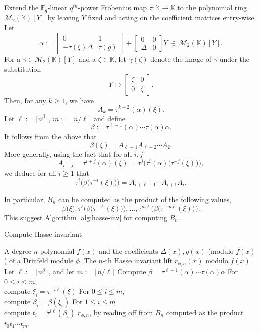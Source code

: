 \documentclass{article}
\theoremstyle{plain}
\theoremstyle{definition}
\def\F{\ensuremath{\mathbb{F}}}
\def\K{\ensuremath{\mathbb{K}}}
\begin{document}
Extend the $\F_q$-linear $q^{th}$-power Frobenius map $\tau: \K \to \K$ to the polynomial ring $\mathscr{M}_2(\K)[Y]$ by leaving $Y$ fixed and acting on the 
coefficient matrices entry-wise.
Let
\[
\alpha := 
\begin{bmatrix}
0 & 1 \\
-\tau(\xi)\Delta & \tau(g)
\end{bmatrix}
+
\begin{bmatrix}
0 & 0 \\
\Delta & 0
\end{bmatrix} Y ~ \in ~ \mathscr{M}_2(\K)[Y].
\]
For a $\gamma \in \mathscr{M}_2(\K)[Y]$ and a $\zeta \in \K$, let $\gamma(\zeta)$ denote the image of $\gamma$ under the substitution \[Y \longmapsto \begin{bmatrix}
\zeta & 0 \\
0 & \zeta
\end{bmatrix}.\]
Then, for any $k \ge 1$, we have $$A_k = \tau^{k - 2}(\alpha)(\xi).$$
Let $\ell := \lceil n^\beta \rceil$, $m := \lceil n / \ell \rceil$ and define 
\[\beta := \tau^{\ell-1}(\alpha) \cdots \tau(\alpha) \alpha.\]
It follows from the above that 
\[\beta(\xi) = A_{\ell-1}A_{\ell - 2} \cdots A_2.\]
More generally, using the fact that for all $i, j$
\[A_{i + j} = \tau^{i + j}(\alpha)(\xi) = \tau^j\Big(\tau^i(\alpha)\big( \tau^{-j}(\xi)\big)\Big),\]
we deduce for all $i \ge 1$ that 
\[\tau^{i}\Big(\beta \big( \tau^{-i}(\xi)\big) \Big) = A_{i + \ell-1} \cdots A_{i + 1}A_i.\]

In particular, $B_n$ can be computed as the product of the following values, 
\[
\beta \big(\xi\big), \tau^{\ell}\Big(\beta \big( \tau^{-\ell}(\xi)\big) \Big), \dots, 
\tau^{m \ell}\Big(\beta \big( \tau^{-m \ell}(\xi)\big) \Big).
\]
This suggest Algorithm \ref{alg:hasse-inv} for computing $B_n$.

\begin{algorithm}[H]
	\caption{Compute Hasse invariant}
	\label{alg:hasse-inv}
	\begin{algorithmic}[1]
		\REQUIRE A degree $n$ polynomial $f(x)$ and the coefficients $\Delta(x), g(x)$ (modulo $f(x)$) of a Drinfeld module $\phi$.
		\ENSURE The $n$-th Hasse invariant lift $r_{\phi,n}(x)$ modulo $f(x)$.
		\STATE Let $\ell := \lceil n^\beta \rceil$, and let $m := \lceil n / \ell \rceil$
		\STATE\label{step:hasse-2}
		Compute $\beta = \tau^{\ell-1}(\alpha) \cdots \tau(\alpha) \alpha$
		\STATE\label{step:hasse-3}
		For $0 \le i \le m$, \\
		compute $\xi_i = \tau^{-i\ell}(\xi)$
		\STATE\label{step:hasse-4}
		For $0 \le i \le m$, \\
		compute $\beta_i = \beta(\xi_i)$
		\STATE\label{step:hasse-5}
		For $1 \le i \le m$ \\
		compute $t_i = \tau^{i\ell}(\beta_i)$
		\RETURN $r_{\phi,n}$, by reading off from $B_n$ computed as the product $t_0t_1 \cdots t_m$.
	\end{algorithmic}
\end{algorithm}
\end{document}
